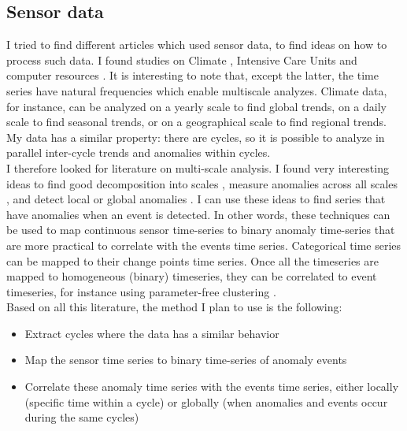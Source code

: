 \documentclass[12pt,a4paper]{article}
\begin{document}
\subsection*{Sensor data}
I tried to find different articles which used sensor data, to find ideas on how to process such data. I found studies on Climate \cite{climate}, Intensive Care Units \cite{icu} and computer resources \cite{incident-diagnosis}. It is interesting to note that, except the latter, the time series have natural frequencies which enable multiscale analyzes. Climate data, for instance, can be analyzed on a yearly scale to find global trends, on a daily scale to find seasonal trends, or on a geographical scale to find regional trends. My data has a similar property: there are cycles, so it is possible to analyze in parallel inter-cycle trends and anomalies within cycles.\\

I therefore looked for literature on multi-scale analysis. I found very interesting ideas to find good decomposition into scales \cite{multiscale-timeseries}, measure anomalies across all scales \cite{multilevel-surprise}, and detect local \cite{anomaly-1, anomaly-2, anomaly-3} or global anomalies \cite{lof, global-local-outliers}.
I can use these ideas to find series that have anomalies when an event is detected.
In other words, these techniques can be used to map continuous sensor time-series to binary anomaly time-series that are more practical to correlate with the events time series. Categorical time series can be mapped to their change points \cite{categorical-time-series, detect-change-points} time series. Once all the timeseries are mapped to homogeneous (binary) timeseries, they can be correlated to event timeseries, for instance using parameter-free clustering \cite{parameter-free-clustering}.\\

Based on all this literature, the method I plan to use is the following:
\begin{itemize}
    \item Extract cycles where the data has a similar behavior
    \item Map the sensor time series to binary time-series of anomaly events
    \item Correlate these anomaly time series with the events time series, either locally (specific time within a cycle) or globally (when anomalies and events occur during the same cycles)
\end{itemize}
\end{document}
